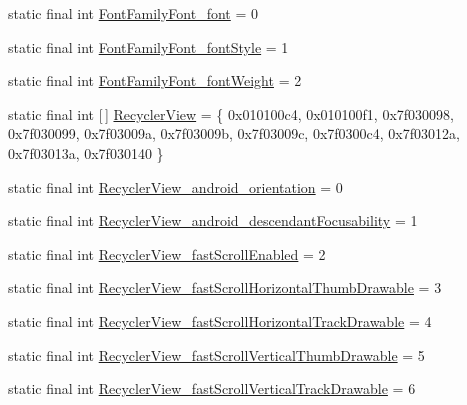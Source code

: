 \begin{DoxyCompactItemize}
\item 
static final int \mbox{\hyperlink{classandroid_1_1support_1_1v7_1_1recyclerview_1_1R_1_1styleable_a6a6fd786ff1b8154e6f5f1d7a7246be4}{Font\+Family\+Font\+\_\+font}} = 0
\item 
static final int \mbox{\hyperlink{classandroid_1_1support_1_1v7_1_1recyclerview_1_1R_1_1styleable_ac32bf5e4b347124959bfbca6000b13fe}{Font\+Family\+Font\+\_\+font\+Style}} = 1
\item 
static final int \mbox{\hyperlink{classandroid_1_1support_1_1v7_1_1recyclerview_1_1R_1_1styleable_a62c034f5e14d7f852095bb1f265f619a}{Font\+Family\+Font\+\_\+font\+Weight}} = 2
\item 
static final int \mbox{[}$\,$\mbox{]} \mbox{\hyperlink{classandroid_1_1support_1_1v7_1_1recyclerview_1_1R_1_1styleable_a04a899c7c67238649fa8d1612c23cf52}{Recycler\+View}} = \{ 0x010100c4, 0x010100f1, 0x7f030098, 0x7f030099, 0x7f03009a, 0x7f03009b, 0x7f03009c, 0x7f0300c4, 0x7f03012a, 0x7f03013a, 0x7f030140 \}
\item 
static final int \mbox{\hyperlink{classandroid_1_1support_1_1v7_1_1recyclerview_1_1R_1_1styleable_add9c53341d0d0e7b55bb93b15daeb562}{Recycler\+View\+\_\+android\+\_\+orientation}} = 0
\item 
static final int \mbox{\hyperlink{classandroid_1_1support_1_1v7_1_1recyclerview_1_1R_1_1styleable_a86aa1de708a59c3626e522e8e4f22d0f}{Recycler\+View\+\_\+android\+\_\+descendant\+Focusability}} = 1
\item 
static final int \mbox{\hyperlink{classandroid_1_1support_1_1v7_1_1recyclerview_1_1R_1_1styleable_a16a1a8ea204cdc15596be047da604579}{Recycler\+View\+\_\+fast\+Scroll\+Enabled}} = 2
\item 
static final int \mbox{\hyperlink{classandroid_1_1support_1_1v7_1_1recyclerview_1_1R_1_1styleable_a342ef035db2dd2e3fcc37eb649e2897d}{Recycler\+View\+\_\+fast\+Scroll\+Horizontal\+Thumb\+Drawable}} = 3
\item 
static final int \mbox{\hyperlink{classandroid_1_1support_1_1v7_1_1recyclerview_1_1R_1_1styleable_a6c4ba53e66e2c39e6a6d6431e1454269}{Recycler\+View\+\_\+fast\+Scroll\+Horizontal\+Track\+Drawable}} = 4
\item 
static final int \mbox{\hyperlink{classandroid_1_1support_1_1v7_1_1recyclerview_1_1R_1_1styleable_a555375d32c5ee971ea05f3ee1dd761b9}{Recycler\+View\+\_\+fast\+Scroll\+Vertical\+Thumb\+Drawable}} = 5
\item 
static final int \mbox{\hyperlink{classandroid_1_1support_1_1v7_1_1recyclerview_1_1R_1_1styleable_ad508a344c0275d0f96680a841ac3ac9e}{Recycler\+View\+\_\+fast\+Scroll\+Vertical\+Track\+Drawable}} = 6

\end{DoxyCompactItemize}
